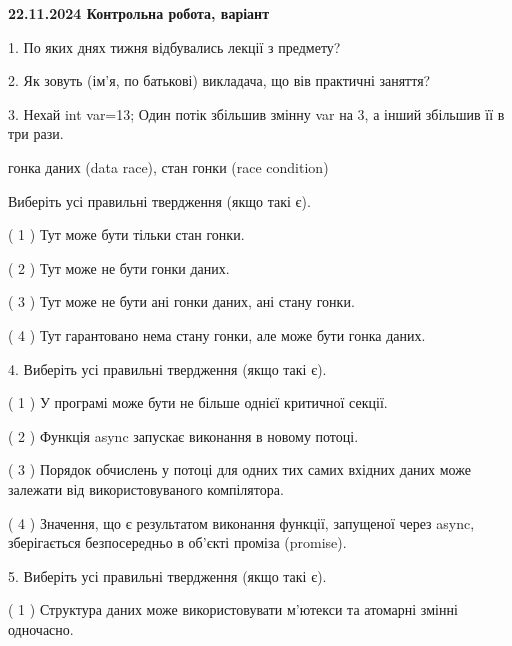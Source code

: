 \documentclass[12pt, ukrainian]{article}
\begin{document}
\vspace{4mm}
\newpage
\begin {large}

\textbf{22.11.2024 Контрольна робота, варіант  }\par


{
1. По яких днях тижня відбувались лекції з предмету?



\vspace{5mm}
2. Як зовуть (ім'я, по батькові) викладача, що вів практичні заняття?



\vspace{5mm}
3. Нехай int var=13; Один потік збільшив змінну var на 3, а інший збільшив її в три рази.

гонка даних (data race), стан гонки (race condition)

Виберіть усі правильні твердження (якщо такі є).\par
\vspace{2mm}
( 1 ) Тут може бути тільки стан гонки.%

( 2 ) Тут може не бути гонки даних.%

( 3 ) Тут може не бути ані гонки даних, ані стану гонки.%

( 4 ) Тут гарантовано нема стану гонки, але може бути гонка даних.%


\vspace{5mm}
4. Виберіть усі правильні твердження (якщо такі є).\par
\vspace{2mm}

( 1 ) У програмі може бути не більше однієї критичної секції.%

( 2 ) Функція async запускає виконання в новому потоці.%

( 3 ) Порядок обчислень у потоці для одних тих самих вхідних даних може залежати від використовуваного компілятора.%

( 4 ) Значення, що є результатом виконання функції, запущеної через async, зберігається безпосередньо в об’єкті проміза (promise).%


\vspace{5mm}
5. Виберіть усі правильні твердження (якщо такі є).\par
\vspace{2mm}

( 1 ) Структура даних може використовувати м’ютекси та атомарні змінні одночасно.%

}
\end{large}
\end{document}
